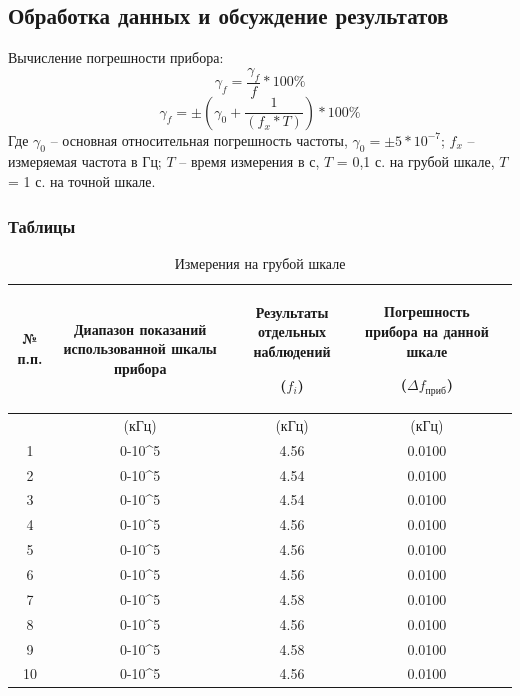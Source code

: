 \subsection{Обработка данных и обсуждение результатов}

Вычисление погрешности прибора:
\begin{equation}
   \gamma_f=  \frac{\gamma_f}{f}*100\%
\end{equation}
\begin{equation}
 \gamma_f=\pm(\gamma_0+\frac{1}{(f_x*T)})*100\%
 \end{equation}
 Где  $\gamma_0$  -- основная относительная погрешность частоты, $ \gamma_0 = \pm5*10^{-7} $; $f_x$ -- измеряемая частота в Гц; $T$ -- время измерения в с, $T$ = 0,1 с. на грубой шкале, $T$ = 1 с. на точной шкале.


\subsubsection{Таблицы}

\begin{center}
\begin{table}[h!]
\centering
\caption{Измерения на грубой шкале}
\label{tabl:1}
\begin{tabular}{|c|c|c|c|c|}
\hline
\begin{minipage}{7mm}
    № п.п. 
\end{minipage}&
\begin{minipage}{5cm}
    Диапазон показаний использованной шкалы прибора
\end{minipage} &
\begin{minipage}{5cm}
    Результаты отдельных наблюдений
    
    ($f_i$)
\end{minipage} &
\begin{minipage}{5cm}
    Погрешность прибора на данной шкале
    
    ($\Delta f_{приб}$)
\end{minipage}\\
\hline
{}&(кГц)&(кГц)&(кГц)\\
\hline
1 & 0-10^5  &  4.56  &  0.0100 \\
2 & 0-10^5  &  4.54  &  0.0100 \\
3 & 0-10^5  &  4.54  &  0.0100 \\
4 & 0-10^5  &  4.56  &  0.0100 \\
5 & 0-10^5  &  4.56  &  0.0100 \\
6  & 0-10^5  &  4.56  &  0.0100 \\
7  & 0-10^5  &  4.58  &  0.0100 \\
8  & 0-10^5  &  4.56  &  0.0100 \\
9  & 0-10^5  &  4.58  &  0.0100 \\
10 & 0-10^5  &  4.56  &  0.0100 \\
\hline
\end{tabular}
\end{table}
\end{center}

